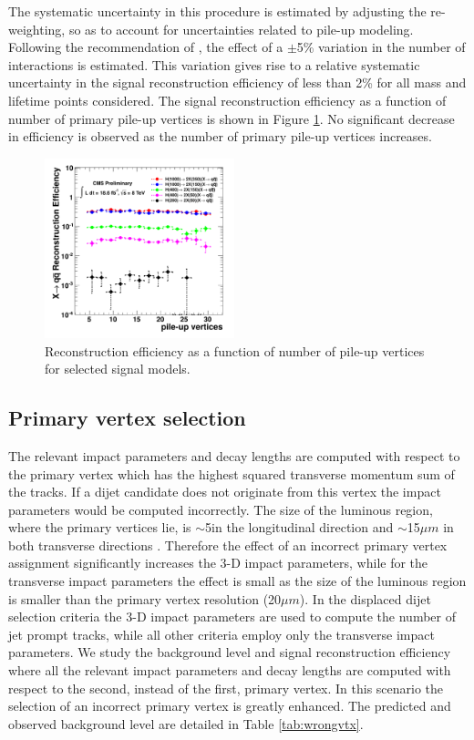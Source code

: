 The systematic uncertainty in this procedure is estimated by adjusting the re-weighting, so as to account
 for uncertainties related to pile-up modeling. Following the recommendation of \cite{PileUpSystematic}, 
the effect of a $\pm$5\% variation in the number of interactions is estimated.
 This variation gives rise to a relative systematic uncertainty in the signal reconstruction efficiency 
of less than 2\% for all mass and lifetime points considered. The signal reconstruction efficiency as
a function of number of primary pile-up vertices is shown in Figure \ref{fig:effPU}. No significant
decrease in efficiency is observed as the number of primary pile-up vertices increases.

\begin{figure}[htbp]
\centering
\includegraphics[width=0.49\textwidth]{plots/signal/effPU.pdf}
\caption{Reconstruction efficiency as a function of number of pile-up vertices for selected
signal models.\label{fig:effPU}}
\end{figure}

\subsection{Primary vertex selection}
\label{subsec:pv}
The relevant impact parameters and decay lengths are computed 
with respect to the primary vertex which has the highest
squared transverse momentum sum of the tracks. If a dijet candidate does not originate from this vertex the impact
parameters would be computed incorrectly. The size of the luminous region, where the primary vertices lie,
 is $\sim$5\cm in the longitudinal direction and $\sim$15$\mu m$ in both transverse directions 
\cite{Bartoldus:1357303}. 
Therefore the effect of an incorrect primary vertex assignment significantly increases the 3-D impact parameters,
 while for
the transverse impact parameters the effect is small as the size of the luminous region is smaller than the 
primary vertex resolution (20$\mu m$).
In the displaced dijet selection criteria the 3-D impact parameters are used to compute 
the number of jet prompt tracks, while all other criteria employ
only the transverse impact parameters. 
 We study the background level and signal reconstruction efficiency where all
 the relevant impact parameters and
decay lengths are computed with respect to the second, instead of the first, primary vertex. In this scenario 
the selection of an incorrect primary vertex is greatly enhanced. The predicted and
observed background level are detailed in Table \ref{tab:wrongvtx}.

